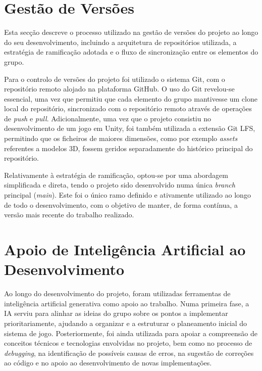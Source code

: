 



\chapter{Gestão de Versões}
\label{ap:gestaoVersoes}

Esta secção descreve o processo utilizado na gestão de versões do projeto ao longo do seu desenvolvimento, incluindo a arquitetura de repositórios utilizada, a estratégia de ramificação adotada e o fluxo de sincronização entre os elementos do grupo.

Para o controlo de versões do projeto foi utilizado o sistema Git, com o repositório remoto alojado na plataforma GitHub. O uso do Git revelou-se essencial, uma vez que permitiu que cada elemento do grupo mantivesse um clone local do repositório, sincronizado com o repositório remoto através de operações de \textit{push} e \textit{pull}. Adicionalmente, uma vez que o projeto consistiu no desenvolvimento de um jogo em Unity, foi também utilizada a extensão Git LFS, permitindo que os ficheiros de maiores dimensões, como por exemplo \textit{assets} referentes a modelos 3D, fossem geridos separadamente do histórico principal do repositório.

Relativamente à estratégia de ramificação, optou-se por uma abordagem simplificada e direta, tendo o projeto sido desenvolvido numa única \textit{branch} principal (\textit{main}). Este foi o único ramo definido e ativamente utilizado ao longo de todo o desenvolvimento, com o objetivo de manter, de forma contínua, a versão mais recente do trabalho realizado.




\chapter{Apoio de Inteligência Artificial ao Desenvolvimento}
\label{ap:apoioIA}

Ao longo do desenvolvimento do projeto, foram utilizadas ferramentas de inteligência artificial generativa como apoio ao trabalho. Numa primeira fase, a IA serviu para alinhar as ideias do grupo sobre os pontos a implementar prioritariamente, ajudando a organizar e a estruturar o planeamento inicial do sistema de jogo. Posteriormente, foi ainda utilizada para apoiar a compreensão de conceitos técnicos e tecnologias envolvidas no projeto, bem como no processo de \textit{debugging}, na identificação de possíveis causas de erros, na sugestão de correções ao código e no apoio ao desenvolvimento de novas implementações.

